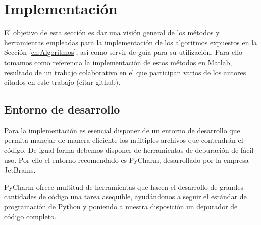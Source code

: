 






\chapter{Implementación}\label{ch:Impl}

El objetivo de esta sección es dar una visión general de los métodos y herramientas empleadas para la implementación de los algoritmos expuestos en la Sección \ref{ch:Algoritmos}, así como servir de guía para su utilización. Para ello tomamos como referencia la implementación de estos métodos en Matlab, resultado de un trabajo colaborativo en el que participan varios de los autores citados en este trabajo (citar github).

\section{Entorno de desarrollo}

Para la implementación es esencial disponer de un entorno de desarrollo que permita manejar de manera eficiente los múltiples archivos que contendrán el código. De igual forma debemos disponer de herramientas de depuración de fácil uso. Por ello el entorno recomendado es PyCharm, desarrollado por la empresa JetBrains.

PyCharm ofrece multitud de herramientas que hacen el desarrollo de grandes cantidades de código una tarea asequible, ayudándonos a seguir el estándar de programación de Python y poniendo a nuestra disposición un depurador de código completo.

